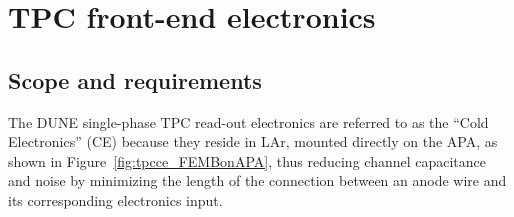 





\section{TPC front-end electronics}
\label{ch:ce}

%
\subsection{Scope and requirements}
\label{subsec:ce_intro}


The DUNE single-phase TPC read-out electronics are referred to as the ``Cold Electronics'' (CE) because they reside in LAr,
mounted directly on the APA, as shown in Figure~\ref{fig:tpcce_FEMBonAPA}, thus reducing channel capacitance and noise by minimizing the length of the connection between an anode wire
and its corresponding electronics input.

